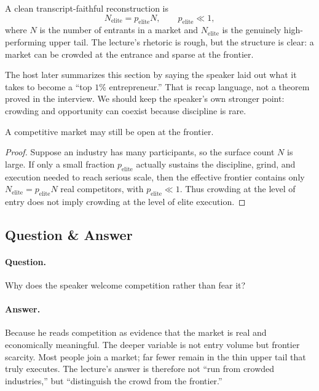 A clean transcript-faithful reconstruction is
\begin{equation}
N_{\text{elite}} = p_{\text{elite}}N,
\qquad
p_{\text{elite}} \ll 1,
\end{equation}
where \(N\) is the number of entrants in a market and \(N_{\text{elite}}\) is the genuinely high-performing upper tail. The lecture's rhetoric is rough, but the structure is clear: a market can be crowded at the entrance and sparse at the frontier.

\begin{remark}
The host later summarizes this section by saying the speaker laid out what it takes to become a ``top \(1\%\) entrepreneur.'' That is recap language, not a theorem proved in the interview. We should keep the speaker's own stronger point: crowding and opportunity can coexist because discipline is rare.
\end{remark}

\begin{proposition}
A competitive market may still be open at the frontier.
\end{proposition}

\begin{proof}
Suppose an industry has many participants, so the surface count \(N\) is large. If only a small fraction \(p_{\text{elite}}\) actually sustains the discipline, grind, and execution needed to reach serious scale, then the effective frontier contains only \(N_{\text{elite}} = p_{\text{elite}}N\) real competitors, with \(p_{\text{elite}} \ll 1\). Thus crowding at the level of entry does not imply crowding at the level of elite execution.
\end{proof}

\subsection{Question \& Answer}

\paragraph{Question.} Why does the speaker welcome competition rather than fear it?

\paragraph{Answer.} Because he reads competition as evidence that the market is real and economically meaningful. The deeper variable is not entry volume but frontier scarcity. Most people join a market; far fewer remain in the thin upper tail that truly executes. The lecture's answer is therefore not ``run from crowded industries,'' but ``distinguish the crowd from the frontier.''

